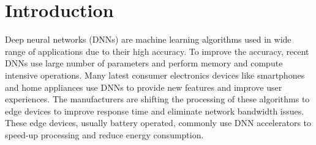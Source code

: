\documentclass[a4paper,10pt]{article}
\begin{document}

\section{Introduction}
Deep neural networks (DNNs) are machine learning algorithms used in wide range of applications due to their high accuracy. To improve the accuracy, recent DNNs use large number of parameters and perform memory and compute intensive operations. Many latest consumer electronics devices like smartphones and home appliances use DNNs to provide new features and improve user experiences. The manufacturers are shifting the processing of these algorithms to edge devices to improve response time and eliminate network bandwidth issues. These edge devices, usually battery operated, commonly use DNN accelerators to speed-up processing and reduce energy consumption. 
\end{document}

